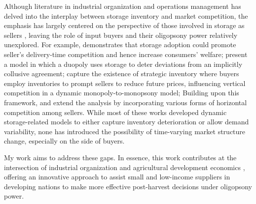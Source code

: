 Although literature in industrial organization and operations management has delved into the interplay between storage inventory and market competition, the emphasis has largely centered on the perspective of those involved in storage as sellers \citep{leng2005game}, leaving the role of input buyers and their oligopsony power relatively unexplored. For example, \cite{li1992role} demonstrates that storage adoption could promote seller's delivery-time competition and hence increase consumers' welfare; \cite{rotemberg1989cyclical} present a model in which a duopoly uses storage to deter deviations from an implicitly collusive agreement; \cite{anand2008strategic} capture the existence of strategic inventory where buyers employ inventories to prompt sellers to reduce future prices, influencing vertical competition in a dynamic monopoly-to-monopsony model; Building upon this framework, \cite{hu2021strategic} and \cite{cai2021supply} extend the analysis by incorporating various forms of horizontal competition among sellers. While most of these works developed dynamic storage-related models to either capture inventory deterioration or allow demand variability, none has introduced the possibility of time-varying market structure change, especially on the side of buyers. 


My work aims to address these gaps. In essence, this work contributes at the intersection of industrial organization and agricultural development economics \citep{bellemare2022agricultural}, offering an innovative approach to assist small and low-income suppliers in developing nations to make more effective post-harvest decisions under oligopsony power.
